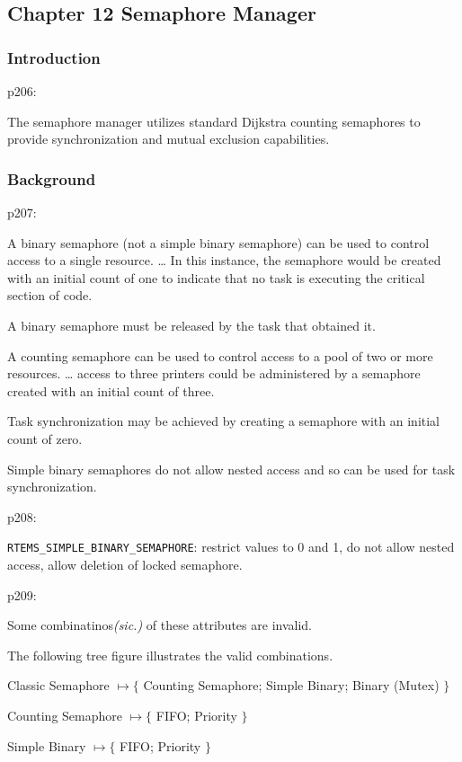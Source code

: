 \subsection{Chapter 12 Semaphore Manager}

\subsubsection{Introduction}

p206:

The semaphore manager utilizes standard Dijkstra counting semaphores
to provide synchronization and mutual exclusion capabilities.

\subsubsection{Background}

p207:

A binary semaphore (not a simple binary semaphore)
can be used to control access to a single resource.
\dots
In this instance, the semaphore would be created with an initial count of one to
indicate that no task is executing the critical section of code.

A binary semaphore must be released by the task that obtained it.

A counting semaphore can be used to control access
to a pool of two or more resources.
\dots
access to three printers could be administered by a semaphore
created with an initial count of three.

Task synchronization may be achieved by creating a semaphore
with an initial count of zero.

Simple binary semaphores do not allow nested access
and so can be used for task synchronization.

p208:

\verb"RTEMS_SIMPLE_BINARY_SEMAPHORE":
restrict values to 0 and 1,
do not allow nested access,
allow deletion of locked semaphore.

p209:

Some combinatinos\emph{(sic.)} of these attributes are invalid.

The following tree figure illustrates the valid combinations.

Classic Semaphore
$\mapsto \{$
 Counting Semaphore; Simple Binary; Binary (Mutex)
$\}$

Counting Semaphore
$\mapsto \{$
 FIFO; Priority
$\}$

Simple Binary
$\mapsto \{$
 FIFO; Priority
$\}$

